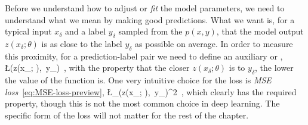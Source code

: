 Before we understand how to adjust or \emph{fit} the model parameters,  we need to understand what we mean by making good predictions. What we want is, for a typical input $x_\delta$ and a label $y_\delta$ sampled from the  $p(x,y)$, that the model output $z(x_\delta; \theta)$ is as close to the label $y_\delta$ as possible on average. In order to measure this proximity, for a prediction-label pair we need to define an auxiliary  or ,
\be\label{eq:loss-per-example}
\L\Big(z(x_\delta; \theta),\, y_\delta\Big) \,,
\ee
with the property that the closer $z(x_\delta; \theta)$ is to $y_\delta$, the lower the value of the function is. One very intuitive choice for the loss is 
\emph{MSE loss}~\eqref{eq:MSE-loss-preview},
\be\label{eq:MSE-loss}
\L_{}\Big(z(x_\delta; \theta),\, y_{\delta}\Big)\equiv {}^2 \,,
\ee
which clearly has the required property,
though this is not the most common choice in deep learning. The specific form of the loss will not matter for the rest of the chapter. 





